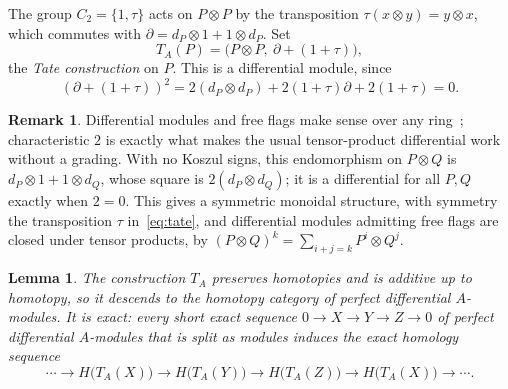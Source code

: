 \documentclass[11pt,reqno]{amsart}
\theoremstyle{plain}
\newtheorem{lemma}[theorem]{Lemma}
\theoremstyle{definition}
\newtheorem{remark}[theorem]{Remark}
\newcommand{\Tate}{T}                 %
\begin{document}
The group $C_2=\{1,\tau\}$ acts on $P\otimes P$ by the transposition $\tau(x\otimes y)=y\otimes x$,
which commutes with $\partial=d_P\otimes1+1\otimes d_P$.  Set
\begin{equation}\label{eq:tate}
 \Tate_A(P)=\bigl(P\otimes P,\ \partial+(1+\tau)\bigr),
\end{equation}
the \emph{Tate construction} on $P$.  This is a differential module, since
\[
(\partial+(1+\tau))^2
 =2(d_P\otimes d_P)+2(1+\tau)\partial+2(1+\tau)=0.
\]

\begin{remark}\label{rem:chartwo}
Differential modules and free flags make sense over any ring~\cite{ABI}; characteristic $2$ is
exactly what makes the usual tensor-product differential work without a grading.  With no Koszul
signs, this endomorphism on $P\otimes Q$ is $d_P\otimes1+1\otimes d_Q$, whose square is
$2(d_P\otimes d_Q)$; it is a differential for all $P,Q$ exactly when $2=0$.  This gives a symmetric
monoidal structure, with symmetry the transposition $\tau$ in~\eqref{eq:tate}, and differential
modules admitting free flags are closed under tensor products, by
$(P\otimes Q)^{k}=\sum_{i+j=k}P^{i}\otimes Q^{j}$.
\end{remark}

\begin{lemma}\label{lem:htpy}
The construction $\Tate_A$ preserves homotopies and is additive up to
homotopy, so it descends to the homotopy category of perfect differential $A$-modules.  It is
\emph{exact}: every short exact sequence $0\to X\to Y\to Z\to0$ of perfect differential $A$-modules that is
split as modules induces the exact homology sequence
\[
\cdots\to H\bigl(\Tate_A(X)\bigr)\to H\bigl(\Tate_A(Y)\bigr)\to H\bigl(\Tate_A(Z)\bigr)\to
H\bigl(\Tate_A(X)\bigr)\to\cdots.
\]
\end{lemma}
\end{document}

